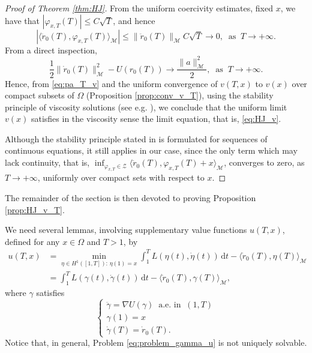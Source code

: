 \documentclass[a4paper,10pt]{amsart}
\newcommand{\ud}{\mathrm{d}}
\theoremstyle{plain}
\theoremstyle{definition}
\numberwithin{equation}{section}
\numberwithin{thm}{section}
\begin{document}
\begin{proof}[Proof of Theorem \ref{thm:HJ}]
    
From the uniform coercivity estimates, fixed $x$, we have that $|\varphi_{x,T}(T)|\le C \sqrt{T}$, and hence
\[
\left|\langle \ddot r_0(T), \varphi_{x,T}(T)\rangle_\mathcal{M} \right| \le \|\ddot r_0(T)\|_\mathcal{M} C \sqrt{T} \to 0, \ \mbox{ as } \ T \to +\infty.
\]
From a direct inspection,
\[
\frac{1}{2}\|\dot r_0(T)\|_\mathcal{M}^2 - U(r_0(T)) \to \frac{\|a\|^2_\mathcal{M}}{2}, \ \mbox{ as } \ T\to +\infty.
\]
Hence, from \eqref{eq:pa_T_v} and the uniform convergence of $v(T,x)$ to $v(x)$ over compact subsets of $\Omega$ (Proposition \ref{prop:conv_v_T}), using the stability principle of viscosity solutions (see e.g. \cite{Crandall}), we conclude that the uniform limit $v(x)$ satisfies in the viscosity sense the limit equation, that is, \eqref{eq:HJ_v}.

Although the stability principle stated in \cite{Crandall} is formulated for sequences of continuous equations, it still applies in our case, since the only term which may lack continuity, that is, $\inf_{\varphi_{x,T} \in \mathcal{Z}}\langle\ddot{r}_0(T),\varphi_{x,T}(T)+x\rangle_\mathcal{M}$, converges to zero, as $T\to+\infty$, uniformly over compact sets with respect to $x$.
\end{proof}

The remainder of the section is then devoted to proving Proposition \ref{prop:HJ_v_T}.

We need several lemmas, involving supplementary value functions $u(T,x)$, defined for any $x \in\Omega$ and $T>1$, by
\begin{equation}\label{eq:u(T,x)_vers1}
\begin{split}
u(T,x)&= \min_{\eta \in H^1([1,T]):\,\eta(1)=x}\int_1^T L(\eta(t),\dot \eta(t))\,\ud t - \langle \dot r_0(T), \eta(T)\rangle_\mathcal{M}
\\
&=\int_1^T L(\gamma(t),\dot{\gamma}(t))\,\ud t - \langle \dot r_0(T), \gamma(T)\rangle_\mathcal{M},
\end{split}
\end{equation}
where $\gamma$ satisfies
\begin{equation} 
\label{eq:problem_gamma_u}
\begin{cases}
\ddot{\gamma} = \nabla U(\gamma) \ \mbox{ a.e. in } \ (1,T)
\\
\gamma(1)=x
\\
\dot{\gamma}(T)=\dot r_0(T).
\end{cases}
\end{equation}
Notice that, in general, Problem \eqref{eq:problem_gamma_u} is not uniquely solvable.
\end{document}
